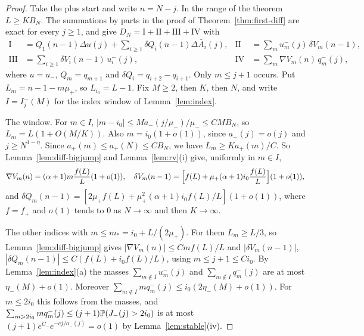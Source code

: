 \begin{proof}
Take the plus start and write $n=N-j$. In the range of the theorem $L\ge KB_N$. The summations
by parts in the proof of Theorem~\ref{thm:first-diff} are exact for every $j\ge1$, and give
$D_N=\mathrm I+\mathrm{II}+\mathrm{III}+\mathrm{IV}$ with
\begin{align*}
 \mathrm I&=Q_1(n-1)\Delta u(j)+\sum_{i\ge1}\delta Q_i(n-1)\Delta\bar A_i(j),&
 \mathrm{II}&=\sum_mu^\minus_m(j)\,\delta V_m(n-1),\\
 \mathrm{III}&=\sum_{i\ge1}\delta V_i(n-1)\,u^\minus_i(j),&
 \mathrm{IV}&=\sum_m\nabla V_m(n)\,q^\minus_m(j),
\end{align*}
where $u=u_\minus$, $Q_m=q_{m+1}$ and $\delta Q_i=q_{i+2}-q_{i+1}$. Only $m\le j+1$ occurs. Put
$L_m=n-1-m\mu_\plus$, so $L_{i_0}=L-1$. Fix $M\ge2$, then $K$, then $N$, and write
$I=I^\minus_j(M)$ for the index window of Lemma~\ref{lem:index}.

The window. For $m\in I$, $|m-i_0|\le Ma_\minus(j/\mu_\minus)/\mu_\minus\le CMB_N$, so
$L_m=L(1+O(M/K))$. Also $m=i_0(1+o(1))$, since $a_\minus(j)=o(j)$ and $j\ge N^{1-\eta}$. Since
$a_\plus(m)\le a_\plus(N)\le CB_N$, we have $L_m\ge Ka_\plus(m)/C$. So
Lemma~\ref{lem:diff-bigjump} and Lemma~\ref{lem:rv}(i) give, uniformly in $m\in I$,
\[
 \nabla V_m(n)=(\alpha+1)m\frac{f(L)}L(1+o(1)),\quad
 \delta V_m(n-1)=\Bigl[f(L)+\mu_{+}(\alpha+1)i_0\frac{f(L)}L\Bigr](1+o(1)),
\]
and $\delta Q_m(n-1)=[2\mu_\plus f(L)+\mu_\plus^2(\alpha+1)i_0f(L)/L](1+o(1))$, where $f=f_\plus$ and
$o(1)$ tends to $0$ as $N\to\infty$ and then $K\to\infty$.

The other indices with $m\le m_*=i_0+L/(2\mu_\plus)$. For them $L_m\ge L/3$, so
Lemma~\ref{lem:diff-bigjump} gives $|\nabla V_m(n)|\le Cmf(L)/L$ and $|\delta V_m(n-1)|$,
$|\delta Q_m(n-1)|\le C(f(L)+i_0f(L)/L)$, using $m\le j+1\le Ci_0$. By Lemma~\ref{lem:index}(a)
the masses $\sum_{m\notin I}u^\minus_m(j)$ and $\sum_{m\notin I}q^\minus_m(j)$ are at most
$\eta_\minus(M)+o(1)$. Moreover $\sum_{m\notin I}mq^\minus_m(j)\le i_0(2\eta_\minus(M)+o(1))$. For
$m\le2i_0$ this follows from the masses, and $\sum_{m>2i_0}mq^{-}_m(j)\le(j+1)\mathbb{P}(J_{-}(j)>2i_0)$
is at most $(j+1)e^{C_-}e^{-cj/a_\minus(j)}=o(1)$ by Lemma~\ref{lem:stable}(iv).


\end{proof}
